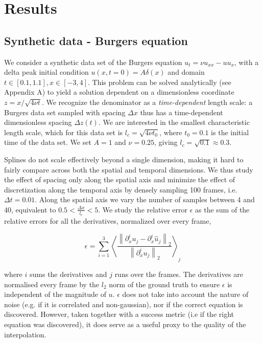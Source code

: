 \documentclass{article} %
\begin{document}
\section{Results}

\subsection{Synthetic data - Burgers equation} 

We consider a synthetic data set of the Burgers equation $u_t = \nu u_{xx} - u u_x$, with a delta peak initial condition $u(x, t=0) = A \delta(x)$ and domain $t \in [0.1, 1.1], x \in [-3, 4]$. This problem can be solved analytically (see Appendix A) to yield a solution dependent on a dimensionless coordinate $z = x / \sqrt{4 \nu t}$. We recognize the denominator as a \textit{time-dependent} length scale: a Burgers data set sampled with spacing $\Delta x$ thus has a time-dependent dimensionless spacing $\Delta z(t)$. We are interested in the smallest characteristic length scale, which for this data set is $l_c = \sqrt{4 \nu t_0}$, where $t_0=0.1$ is the initial time of the data set. We set $A=1$ and $\nu=0.25$, giving $l_c = \sqrt{0.1} \approx 0.3$.

Splines do not scale effectively beyond a single dimension, making it hard to fairly compare across both the spatial and temporal dimensions. We thus study the effect of spacing only along the spatial axis and minimize the effect of discretization along the temporal axis by densely sampling 100 frames, i.e. $\Delta t = 0.01$. Along the spatial axis we vary the number of samples between 4 and 40, equivalent to $0.5 < \frac{\Delta x}{l_c} < 5$. We study the relative error $\epsilon$ as the sum of the relative errors for all the derivatives, normalized over every frame, 

\begin{equation}
    \epsilon = \sum_{i=1}^{3} \left\langle\frac{\left\lVert\partial_{x}^{i} u_j - \partial_{x}^i \hat{u}_j\right\rVert_2}{\left\lVert \partial_{x}^{i} u_j \right\rVert_2}\right\rangle_j
    \label{eq:error}
\end{equation}

where $i$ sums the derivatives and $j$ runs over the frames. The derivatives are normalised every frame by the $l_2$ norm of the ground truth to ensure $\epsilon$ is independent of the magnitude of $u$. $\epsilon$ does not take into account the nature of noise (e.g. if it is correlated and non-gaussian), nor if the correct equation is discovered. However, taken together with a success metric (i.e if the right equation was discovered), it does serve as a useful proxy to the quality of the interpolation. 
\end{document}
